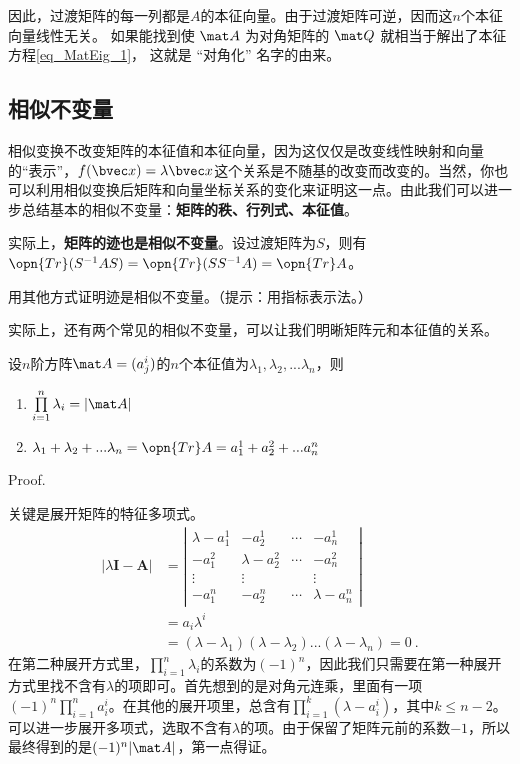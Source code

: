 因此，过渡矩阵的每一列都是$A$的本征向量。由于过渡矩阵可逆，因而这$n$个本征向量线性无关。
如果能找到使 $\mat A$ 为对角矩阵的 $\mat Q$ 就相当于解出了本征方程\autoref{eq_MatEig_1}， 这就是 “对角化” 名字的由来。

\subsection{相似不变量}
相似变换不改变矩阵的本征值和本征向量，因为这仅仅是改变线性映射和向量的“表示”，$f(\bvec x)=\lambda \bvec x$这个关系是不随基的改变而改变的。当然，你也可以利用相似变换后矩阵和向量坐标关系的变化来证明这一点。由此我们可以进一步总结基本的相似不变量：\textbf{矩阵的秩、行列式、本征值}。

实际上，\textbf{矩阵的迹也是相似不变量}。设过渡矩阵为$S$，则有$\opn {Tr}(S^{-1}AS)=\opn {Tr}(SS^{-1}A)=\opn {Tr}A$。
\begin{exercise}{}
用其他方式证明迹是相似不变量。（提示：用指标表示法。）
\end{exercise}
实际上，还有两个常见的相似不变量，可以让我们明晰矩阵元和本征值的关系。
\begin{theorem}{}\label{the_MatEig_3}
设$n$阶方阵$\mat A=(a^i_j)$的$n$个本征值为$\lambda_1,\lambda_2,...\lambda_n$，则
\begin{enumerate}
\item $\prod\limits^n_{i=1}\lambda_i=|\mat A|$
\item $\lambda_1+\lambda_2+...\lambda_n=\opn{Tr}A =a^1_1+a^2_2+...a^n_n$
\end{enumerate}
\end{theorem}
Proof.

关键是展开矩阵的特征多项式。
\begin{equation}
\begin{aligned}
|\lambda \boldsymbol{I}-\boldsymbol{A}| & =\left|\begin{array}{cccc}
\lambda-a^1_{1} & -a^1_{2} & \cdots & -a^1_{n} \\
-a^2_{1} & \lambda-a^2_{2} & \cdots & -a^2_{ n} \\
\vdots & \vdots & & \vdots \\
-a^n_{ 1} & -a^n_{ 2} & \cdots & \lambda-a^n_{ n}
\end{array}\right| \\
&=a_i\lambda^i\\
& =(\lambda-\lambda_1)(\lambda-\lambda_2)...(\lambda-\lambda_n)=0~.
\end{aligned}
\end{equation}
在第二种展开方式里，$\prod\limits^n_{i=1}\lambda_i$的系数为$(-1)^n$，因此我们只需要在第一种展开方式里找不含有$\lambda$的项即可。首先想到的是对角元连乘，里面有一项$(-1)^{n}\prod \limits^n_{i=1}a^i_i$。在其他的展开项里，总含有$\prod \limits^k_{i=1}(\lambda-a^i_i)$，其中$k\le n-2$。可以进一步展开多项式，选取不含有$\lambda$的项。由于保留了矩阵元前的系数$-1$，所以最终得到的是$(-1)^n |\mat A|$，第一点得证。

